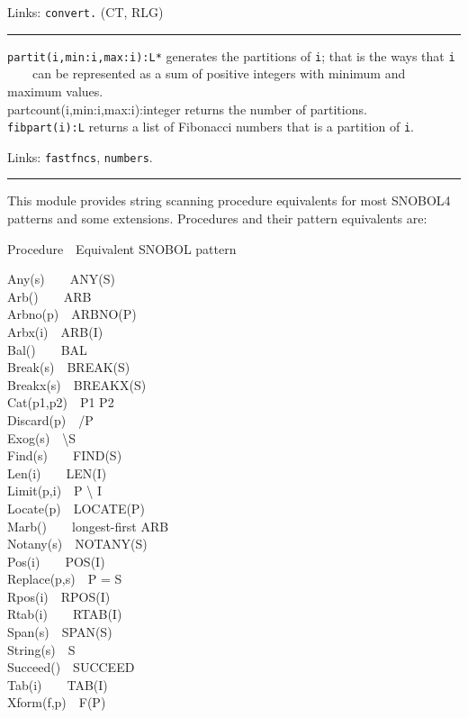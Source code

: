 Links: \texttt{convert.} (CT, RLG)

\vspace{0.25cm}\hrule{}

\texttt{partit(i,min:i,max:i):L*} generates the partitions of
\texttt{i}; that is the ways that \texttt{i\\
} \ \ \ \ can be represented as a sum of positive integers with minimum
and maximum values.\\
partcount(i,min:i,max:i):integer returns the number of
partitions.\\
\texttt{fibpart(i):L} returns a list of Fibonacci numbers that is a
partition of \texttt{i}.

Links: \texttt{fastfncs}, \texttt{numbers}. 

\vspace{0.25cm}\hrule{}

This module provides string scanning procedure equivalents for most
SNOBOL4 patterns and some
extensions. Procedures and their pattern equivalents are:

Procedure\ \ Equivalent SNOBOL pattern

Any(s)\ \ \ \ ANY(S)\\
Arb()\ \ \ \ ARB\\
Arbno(p)\ \ ARBNO(P)\\
Arbx(i)\ \ ARB(I)\\
Bal()\ \ \ \ BAL\\
Break(s)\ \ BREAK(S)\\
Breakx(s)\ \ BREAKX(S)\\
Cat(p1,p2)\ \ P1 P2\\
Discard(p)\ \ /P\\
Exog(s)\ \ {\textbackslash}S\\
Find(s)\ \ \ \ FIND(S)\\
Len(i)\ \ \ \ LEN(I)\\
Limit(p,i)\ \ P {\textbackslash} I\\
Locate(p)\ \ LOCATE(P)\\
Marb()\ \ \ \ longest-first ARB\\
Notany(s)\ \ NOTANY(S)\\
Pos(i)\ \ \ \ POS(I)\\
Replace(p,s)\ \ P = S\\
Rpos(i)\ \ RPOS(I)\\
Rtab(i)\ \ \ \ RTAB(I)\\
Span(s)\ \ SPAN(S)\\
String(s)\ \ S\\
Succeed()\ \ SUCCEED\\
Tab(i)\ \ \ \ TAB(I)\\
Xform(f,p)\ \ F(P)

